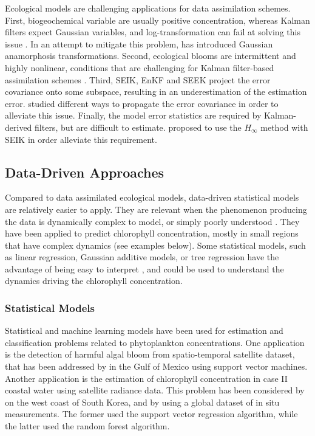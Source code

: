 Ecological models are challenging applications for data assimilation schemes. 
First, biogeochemical variable are usually positive concentration, whereas 
Kalman filters expect Gaussian variables, and log-transformation can fail at 
solving this issue \citep{Ciavatta2011}. In an attempt to mitigate this problem, 
\citet{Fontana2013} has introduced Gaussian anamorphosis transformations. 
Second, ecological blooms are intermittent and highly nonlinear, conditions that 
are challenging for Kalman filter-based assimilation schemes 
\citep{Triantafyllou2012, Korres2012}. Third, SEIK, EnKF and SEEK project the 
error covariance onto some subspace, resulting in an underestimation of the 
estimation error. \citet{Butenschon2012} studied different ways to propagate the 
error covariance in order to alleviate this issue. Finally, the model error 
statistics are required by Kalman-derived filters, but are difficult to 
estimate. \citet{Triantafyllou2012} proposed to use the $H_\infty$ method with 
SEIK in order alleviate this requirement.

\subsection{Data-Driven Approaches}

Compared to data assimilated ecological models, data-driven statistical models 
are relatively easier to apply. They are relevant when the phenomenon producing 
the data is dynamically complex to model, or simply poorly understood 
\cite{Gareth2013}. They have been applied to predict chlorophyll concentration, 
mostly in small regions that have complex dynamics (see examples below). Some 
statistical models, such as linear regression, Gaussian additive models, or tree 
regression have the advantage of being easy to interpret \citep{Gareth2013}, and 
could be used to understand the dynamics driving the chlorophyll concentration.

\subsubsection{Statistical Models}

Statistical and machine learning models have been used for estimation and 
classification problems related to phytoplankton concentrations. One application 
is the detection of harmful algal bloom from spatio-temporal satellite dataset, 
that has been addressed by \citet{Gokaraju2011} in the Gulf of Mexico using 
support vector machines. Another application is the estimation of chlorophyll 
concentration in case II coastal water using satellite radiance data. This 
problem has been considered by \citet{Kim2014} on the west coast of South Korea, 
and by \citet{Camps-Valls2006} using a global dataset of in situ measurements. 
The former used the support vector regression algorithm, while the latter used 
the random forest algorithm.

